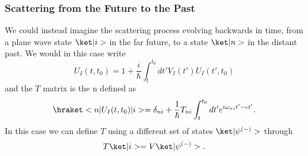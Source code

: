 \subsubsection{Scattering from the Future to the Past}
We could instead imagine the scattering process evolving backwards in time, from a plane wave state $\k{i}$ in the far future, to a state $\k{n}$ in the distant past. We would in this case write 
\begin{equation}
    U_I(t,t_0) = 1 + \frac{i}{\hbar} \int_{t}^{t_0} dt' V_I(t') U_I(t',t_0)
\end{equation}
and the $T$ matrix is the n defined as 
\begin{equation}
    \bkop{n}{U_I(t,t_0)}{i} = \delta_{ni} + \frac{1}{\hbar} T_{ni} \int_{t}^{t_0} dt' e^{i\omega_{ni} t' - \epsilon t'}.
\end{equation}
In this case we can define $T$ using a different set of states $\k{\psi^{(-)}}$ through
\begin{equation}
    T\k{i} = V \k{\psi^{(-)}}.
\end{equation}

